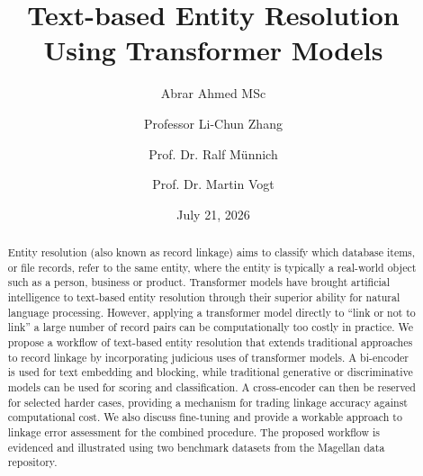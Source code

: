 \documentclass[11pt]{article}
\begin{document}

\title{
    \vspace{-1.2cm}
    \textbf{\LARGE Text-based Entity Resolution Using Transformer Models}
}

\author{
    Abrar Ahmed MSc
    \and
    Professor Li-Chun Zhang
    \and
    Prof. Dr. Ralf Münnich
    \and
    Prof. Dr. Martin Vogt
}

\date{July 21, 2026}

\maketitle

\vspace{-0.5em}


\begin{abstract}

Entity resolution (also known as record linkage) aims to classify which database
items, or file records, refer to the same entity, where the entity is typically a
real-world object such as a person, business or product. Transformer models have
brought artificial intelligence to text-based entity resolution through their
superior ability for natural language processing. However, applying a transformer
model directly to ``link or not to link'' a large number of record pairs can be
computationally too costly in practice. We propose a workflow of text-based entity
resolution that extends traditional approaches to record linkage by incorporating
judicious uses of transformer models. A bi-encoder is used for text embedding and
blocking, while traditional generative or discriminative models can be used for
scoring and classification. A cross-encoder can then be reserved for selected harder
cases, providing a mechanism for trading linkage accuracy against computational cost.
We also discuss fine-tuning and provide a workable approach to linkage error
assessment for the combined procedure. The proposed workflow is evidenced and
illustrated using two benchmark datasets from the Magellan data repository.

\end{abstract}
\end{document}
